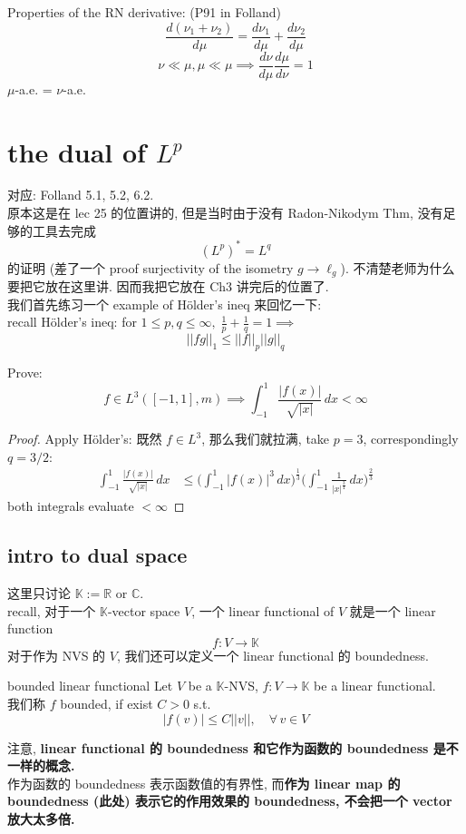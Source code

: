 \documentclass[lang=cn,11pt]{elegantbook}
\begin{document}
Properties of the RN derivative:
(P91 in Folland)
\[
\frac{d(\nu_1 + \nu_2)}{d \mu} = \frac{d \nu_1}{d\mu} + \frac{d\nu_2}{d \mu}
\]
\[
\nu \ll \mu ,\mu \ll \mu \implies \frac{d\nu}{d\mu} \frac{d\mu}{d\nu}  = 1
\]
$\mu$-a.e. = $\nu$-a.e.













\chapter{the dual of $L^p$}
对应: Folland 5.1, 5.2, 6.2.\\
原本这是在 lec 25 的位置讲的, 但是当时由于没有 Radon-Nikodym Thm, 没有足够的工具去完成 \[
(L^p)^* = L^q
\]
的证明 (差了一个 proof surjectivity of the isometry $g \to \ell_g$). 不清楚老师为什么要把它放在这里讲. 因而我把它放在 Ch3 讲完后的位置了.\\
我们首先练习一个 example of Hölder's ineq 来回忆一下:\\
recall Hölder's ineq: for $1\leq p,q\leq\infty,\; \frac{1}{p}+\frac{1}{q} = 1\implies$ \[
||fg||_1 \leq ||f||_p ||g||_q
\]
\begin{example}
Prove:\[
    f \in L^3 ([-1,1],m)\implies \int_{-1}^1 \frac{|f(x)|}{\sqrt{|x|}} \,dx < \infty
    \]
\begin{proof}
    Apply Hölder's: 既然 $f\in L^3$, 那么我们就拉满, take $p=3$, correspondingly $ q=3/2$:\begin{align}
        \int_{-1}^1 \frac{|f(x)|}{\sqrt{|x|}} \,dx   &\leq \bigg(\int_{-1}^1 |f(x)|^3\, dx\bigg)^\frac{1}{3} \bigg(\int_{-1}^1  \frac{1}{|x|^{\frac{3}{4}}} \,dx    \bigg)^\frac{2}{3}
    \end{align} both integrals evaluate $<\infty$
\end{proof}
\end{example}

\section{intro to dual space}
这里只讨论 $\mathbb{K} := \mathbb{R}$ or $\mathbb{C}$.\\
recall, 对于一个 $\mathbb{K}$-vector space $V$, 一个 linear functional of $V$ 就是一个 linear function \[
f:V \to \mathbb{K}
\]
对于作为 NVS 的 $V$, 我们还可以定义一个 linear functional 的 boundedness. 
\begin{definition}{bounded linear functional }
 Let $V$ be a $\mathbb{K}$-NVS, $f:V \to \mathbb{K}$ be a linear functional.\\
 我们称 $f$ bounded, if exist $C>0$ s.t. \[
|f(v)| \leq C||v||,\quad \forall \,v \in V
\]
\end{definition}
\begin{remark}
注意, \textbf{linear functional 的 boundedness 和它作为函数的 boundedness 是不一样的概念.}\\
作为函数的 boundedness 表示函数值的有界性, 而\textbf{作为  linear map 的 boundedness (此处) 表示它的作用效果的 boundedness, 不会把一个 vector 放大太多倍.}
\end{remark}
\end{document}

